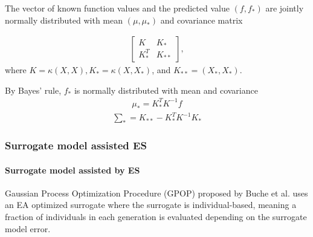 The vector of known function values and the predicted value $(f,f_*)$ are jointly normally distributed with mean $(\mu,\mu_*)$ and covariance matrix

\begin{align}
\begin{bmatrix}
K & K_*\\
K_*^T&K_{**}
\end{bmatrix},
\end{align}
where $K = \kappa(X,X),K_* = \kappa (X,X_*)$, and $K_{**} = (X_*,X_*)$. 

By Bayes' rule, $f_*$ is normally distributed with mean and covariance 
\begin{align}\label{eqn:GP_mean}{}
\mu_* = K_*^T K^{-1}f
\end{align}
\begin{align}\label{eqn:GP_cov}{}
\sum_* = K_{**}- K_*^TK^{-1}K_*
\end{align}








\subsubsection{Surrogate model assisted ES}\label{sssec:surrogate_assisted_ES}\hfill



\paragraph{Surrogate model assisted by ES}
Gaussian Process Optimization Procedure (GPOP) proposed by Buche et al. \cite{1424193} uses an EA optimized surrogate where the surrogate is individual-based, meaning a fraction of individuals in each generation is evaluated depending on the surrogate model error. 

